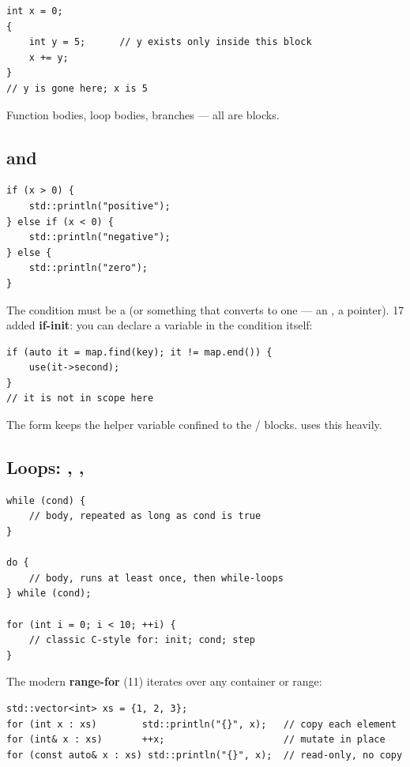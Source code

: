 \begin{lstlisting}
int x = 0;
{
    int y = 5;      // y exists only inside this block
    x += y;
}
// y is gone here; x is 5
\end{lstlisting}

Function bodies, loop bodies,  branches --- all are blocks.

\subsection{ and }

\begin{lstlisting}
if (x > 0) {
    std::println("positive");
} else if (x < 0) {
    std::println("negative");
} else {
    std::println("zero");
}
\end{lstlisting}

The condition must be a  (or something that converts to
one --- an , a pointer). \cpp{}17 added \textbf{if-init}:
you can declare a variable in the condition itself:

\begin{lstlisting}
if (auto it = map.find(key); it != map.end()) {
    use(it->second);
}
// it is not in scope here
\end{lstlisting}

The form  keeps the helper variable confined
to the / blocks. \maya{} uses this heavily.

\subsection{Loops: , , }

\begin{lstlisting}
while (cond) {
    // body, repeated as long as cond is true
}

do {
    // body, runs at least once, then while-loops
} while (cond);

for (int i = 0; i < 10; ++i) {
    // classic C-style for: init; cond; step
}
\end{lstlisting}

The modern \textbf{range-for} (\cpp{}11) iterates over any container
or range:

\begin{lstlisting}
std::vector<int> xs = {1, 2, 3};
for (int x : xs)        std::println("{}", x);   // copy each element
for (int& x : xs)       ++x;                     // mutate in place
for (const auto& x : xs) std::println("{}", x);  // read-only, no copy
\end{lstlisting}

